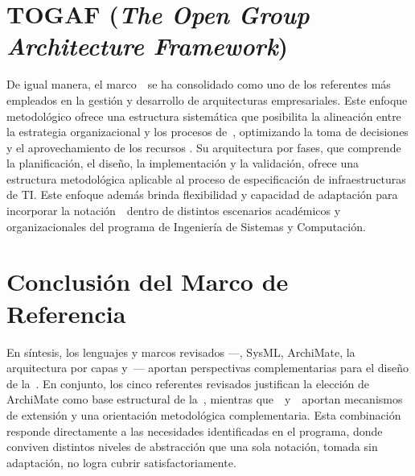 \section{TOGAF (\textit{The Open Group Architecture Framework})}
\noindent
De igual manera, el marco~\TOGAF~se ha consolidado como uno de los referentes más empleados en la gestión y desarrollo de arquitecturas empresariales. Este enfoque metodológico ofrece una estructura sistemática que posibilita la alineación entre la estrategia organizacional y los procesos de~\TI{}, optimizando la toma de decisiones y el aprovechamiento de los recursos \citep{Mumtaza2025}. Su arquitectura por fases, que comprende la planificación, el diseño, la implementación y la validación, ofrece una estructura metodológica aplicable al proceso de especificación de infraestructuras de TI. Este enfoque además brinda flexibilidad y capacidad de adaptación para incorporar la notación~\NDITI~dentro de distintos escenarios académicos y organizacionales del programa de Ingeniería de Sistemas y Computación.


\section{Conclusión del Marco de Referencia}
\noindent
En síntesis, los lenguajes y marcos revisados —\UML{}, SysML, ArchiMate, la arquitectura por capas y~\TOGAF— aportan perspectivas complementarias para el diseño de la~\NDITI. En conjunto, los cinco referentes revisados justifican la elección de ArchiMate como base estructural de la~\NDITI{}, mientras que~\UML~y~\TOGAF~aportan mecanismos de extensión y una orientación metodológica complementaria. Esta combinación responde directamente a las necesidades identificadas en el programa, donde conviven distintos niveles de abstracción que una sola notación, tomada sin adaptación, no logra cubrir satisfactoriamente.